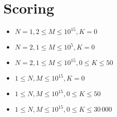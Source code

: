 \section*{Scoring}
\begin{itemize}
  \item $N = 1, 2 \le M \le 10^{15}, K = 0$
  \item $N = 2, 1 \le M \le 10^5, K = 0$
  \item $N = 2, 1 \le M \le 10^{15}, 0 \le K \le 50$
  \item $1 \le N, M \le 10^{15}, K = 0$
  \item $1 \le N, M \le 10^{15}, 0 \le K \le 50$
  \item $1 \le N, M \le 10^{15}, 0 \le K \le 30\,000$
\end{itemize}
